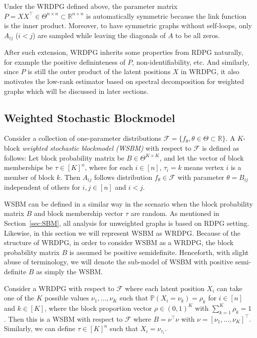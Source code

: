 Under the WRDPG defined above, the parameter matrix $P = X X^{\top} \in \Theta^{n \times n} \subset \mathbb{R}^{n \times n}$ is automatically symmetric because the link function is the inner product. Moreover, to have symmetric graphs without self-loops, only $A_{ij}$ ($i < j$) are sampled while leaving the diagonals of $A$ to be all zeros.

After such extension, WRDPG inherits some properties from RDPG naturally, for example the positive defininteness of $P$, non-identifiability, etc. And similarly, since $P$ is still the outer product of the latent positions $X$ in WRDPG, it also motivates the low-rank estimator based on spectral decomposition for weighted graphs which will be discussed in later sections.




\subsection{Weighted Stochastic Blockmodel}
\label{sec:WSBM}

\begin{definition} 
\label{def:SBM}
Consider a collection of one-parameter distributions $\mathcal{F} = \{ f_{\theta}, \theta \in \Theta \subset \mathbb{R} \}$. A $K$-block {\em{weighted stochastic blockmodel (WSBM)}} with respect to $\mathcal{F}$ is defined as follows: Let block probability matrix be $B \in \Theta^{K \times K}$, and let the vector of block memberships be $\tau \in [K]^n$, where for each $i \in [n]$, $\tau_i = k$ means vertex $i$ is a member of block $k$. Then $A_{ij}$ follows distribution $f_{\theta} \in \mathcal{F}$ with parameter $\theta = B_{ij}$ independent of others for $i, j \in [n]$ and $i < j$.
\end{definition}

WSBM can be defined in a similar way in the scenario when the block probability matrix $B$ and block membership vector $\tau$ are random. As mentioned in Section~\ref{sec:SBM}, all analysis for unweighted graphs is based on RDPG setting. Likewise, in this section we will represent WSBM as WRDPG. Because of the structure of WRDPG, in order to consider WSBM as a WRDPG, the block probability matrix $B$ is assumed be positive semidefinite. Henceforth, with slight abuse of terminology, we will denote the sub-model of WSBM with positive semi-definite $B$ as simply the WSBM.

\begin{definition} 
\label{def:SBM_RDPG}
Consider a WRDPG with respect to $\mathcal{F}$ where each latent position $X_i$ can take one of the $K$ possible values $\nu_1, \dots, \nu_K$ such that $\mathbb{P}(X_i = \nu_k) = \rho_k$ for $i \in [n]$ and $k \in [K]$, where the block proportion vector $\rho \in (0,1)^K$ with $\sum_{k=1}^K \rho_k = 1$. Then this is a WSBM with respect to $\mathcal{F}$ where $B = \nu^{\top} \nu$ with $\nu = [\nu_1, \dots, \nu_K]^{\top}$. Similarly, we can define $\tau \in [K]^n$ such that $X_i = \nu_{\tau_i}$. 
\end{definition}

